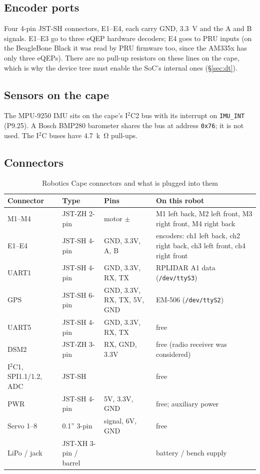 \subsection{Encoder ports}

Four 4-pin JST-SH connectors, E1--E4, each carry GND, \SI{3.3}{V} and the A
and B signals. E1--E3 go to three eQEP hardware decoders; E4 goes to PRU
inputs (on the BeagleBone Black it was read by PRU firmware too, since the
AM335x has only three eQEPs). There are no pull-up resistors on these lines on
the cape, which is why the device tree must enable the SoC's internal ones
(\S\ref{sec:dt}).

\subsection{Sensors on the cape}

The MPU-9250 IMU sits on the cape's I$^2$C2 bus with its interrupt on
\texttt{IMU\_INT} (P9.25). A Bosch BMP280 barometer shares the bus at address
\texttt{0x76}; it is not used. The I$^2$C buses have \SI{4.7}{k\ohm} pull-ups.

\subsection{Connectors}

\begin{table}[htbp]
\centering
\caption{Robotics Cape connectors and what is plugged into them}
\label{tab:capeconn}
\small
\begin{tabularx}{\linewidth}{lllX}
\toprule
Connector & Type & Pins & On this robot \\
\midrule
M1--M4 & JST-ZH 2-pin & motor $\pm$ & M1 left back, M2 left front, M3 right front, M4 right back \\
E1--E4 & JST-SH 4-pin & GND, 3.3V, A, B & encoders: ch1 left back, ch2 right back, ch3 left front, ch4 right front \\
UART1 & JST-SH 4-pin & GND, 3.3V, RX, TX & RPLIDAR A1 data (\texttt{/dev/ttyS3}) \\
GPS & JST-SH 6-pin & GND, 3.3V, RX, TX, 5V, GND & EM-506 (\texttt{/dev/ttyS2}) \\
UART5 & JST-SH 4-pin & GND, 3.3V, RX, TX & free \\
DSM2 & JST-ZH 3-pin & RX, GND, 3.3V & free (radio receiver was considered) \\
I$^2$C1, SPI1.1/1.2, ADC & JST-SH & & free \\
PWR & JST-SH 4-pin & 5V, 3.3V, GND & free; auxiliary power \\
Servo 1--8 & 0.1'' 3-pin & signal, 6V, GND & free \\
LiPo / jack & JST-XH 3-pin / barrel & & battery / bench supply \\
\bottomrule
\end{tabularx}
\end{table}

